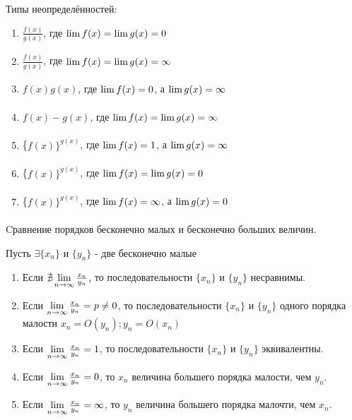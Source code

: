 \documentclass{article}
\begin{document}


Типы неопределённостей:
\begin{enumerate}
	\item{}$\frac{f(x)}{g(x)}$, где $\lim\limits_{} f(x)=\lim\limits_{}g(x)=0$
	\item{}$\frac{f(x)}{g(x)}$, где $\lim\limits_{}f(x)=\lim\limits_{}g(x)=\infty$
	\item{}$f(x)g(x)$, где $\lim\limits_{}f(x)=0$, а $\lim\limits_{}g(x)=\infty$
	\item{}$f(x)-g(x)$, где $\lim\limits_{}f(x)=\lim\limits_{}g(x)=\infty$
	\item{}\{$f(x)\}^{g(x)}$, где $\lim\limits_{}f(x)=1$, а $\lim\limits_{}g(x)=\infty$
	\item{}\{$f(x)\}^{g(x)}$, где $\lim\limits_{} f(x)=\lim\limits_{}g(x)=0$
	\item{}\{$f(x)\}^{g(x)}$, где $\lim\limits_{}f(x)=\infty$, а $\lim\limits_{}g(x)=0$
\end{enumerate}

Cравнение порядков бесконечно малых и бесконечно больших величин.

Пусть $\exists \{x_n\}$ и $\{y_n\}$ - две бесконечно малые
\begin{enumerate}
	\item{}Если $\nexists \lim\limits_{n \to \infty}\frac{x_n}{y_n}$, то последовательности $\{x_n\}$ и $\{y_n\}$ несравнимы.
	\item{}Если $\lim\limits_{n \to \infty}\frac{x_n}{y_n}=p\neq 0$, то последовательности $\{x_n\}$ и $\{y_n\}$ одного порядка малости $x_n=O(y_n);y_n=O(x_n)$
	\item{}Если $ \lim\limits_{n \to \infty}\frac{x_n}{y_n}=1$, то последовательности $\{x_n\}$ и $\{y_n\}$ эквивалентны.
	\item{}Если $ \lim\limits_{n \to \infty}\frac{x_n}{y_n}=0$, то $x_n$ величина большего порядка малости, чем $y_n$.
	\item{}Если $ \lim\limits_{n \to \infty}\frac{x_n}{y_n}=\infty$, то $y_n$ величина большего порядка малочти, чем $x_n$.

\end{enumerate}
\end{document}
